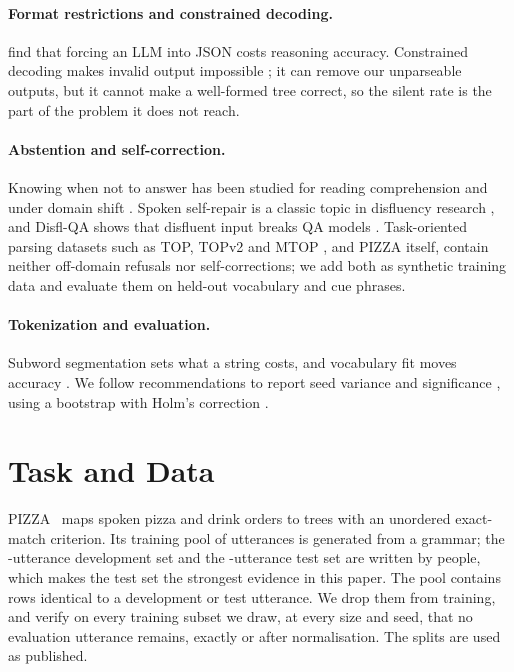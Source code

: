 \documentclass[11pt]{article}
\begin{document}
\paragraph{Format restrictions and constrained decoding.}
\citet{tam} find that forcing an LLM into JSON costs reasoning accuracy. Constrained
decoding makes invalid output impossible \citep{picard,gcd,outlines}; it can
remove our unparseable outputs, but it cannot make a well-formed tree correct, so
the silent rate is the part of the problem it does not reach.

\paragraph{Abstention and self-correction.}
Knowing when not to answer has been studied for reading comprehension
\citep{squad2} and under domain shift \citep{selective}. Spoken self-repair is a
classic topic in disfluency research \citep{shriberg}, and Disfl-QA shows that
disfluent input breaks QA models \citep{disflqa}. Task-oriented parsing datasets
such as TOP, TOPv2 and MTOP \citep{top,topv2,mtop}, and PIZZA itself, contain
neither off-domain refusals nor self-corrections; we add both as synthetic
training data and evaluate them on held-out vocabulary and cue phrases.

\paragraph{Tokenization and evaluation.}
Subword segmentation \citep{bpe} sets what a string costs, and vocabulary fit moves
accuracy \citep{tokenizer}. We follow recommendations to report seed variance and
significance \citep{dror,bouthillier}, using a bootstrap \citep{efron} with Holm's
correction \citep{holm}.

\section{Task and Data}
\label{sec:data}

PIZZA~\citep{pizza} maps spoken pizza and drink orders to trees with an unordered
exact-match criterion. Its training pool of \publishedTrainN{} utterances is
generated from a grammar; the \nDev{}-utterance development set and the
\nTest{}-utterance test set are written by people, which makes the test set the
strongest evidence in this paper. The pool contains \publishedGap{} rows identical
to a development or test utterance. We drop them from training, and verify on
every training subset we draw, at every size and seed, that no evaluation
utterance remains, exactly or after normalisation. The splits are used as
published.
\end{document}
